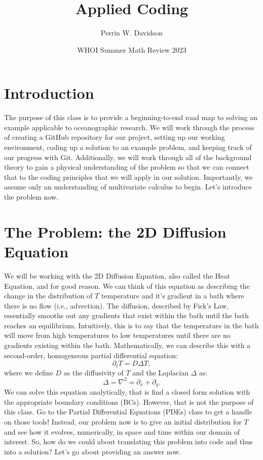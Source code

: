 \documentclass[11pt]{article}
\begin{document}
\title{Applied Coding}

\author{Perrin W. Davidson}

\date{WHOI Summer Math Review 2023}

\maketitle

\section*{Introduction}

The purpose of this class is to provide a beginning-to-end road map to solving an example applicable to oceanographic research.
We will work through the process of creating a GitHub repository for our project, setting up our working environment, coding up a solution to an example problem, and keeping track of our progress with Git. 
Additionally, we will work through all of the background theory to gain a physical understanding of the problem so that we can connect that to the coding principles that we will apply in our solution.
Importantly, we assume only an understanding of multivariate calculus to begin.
Let's introduce the problem now.

\section*{The Problem: the 2D Diffusion Equation}

We will be working with the 2D Diffusion Equation, also called the Heat Equation, and for good reason.
We can think of this equation as describing the change in the distribution of $T$ temperature and it's gradient in a bath where there is no flow (i.e., advection).
The diffusion, described by Fick's Law, essentially smooths out any gradients that exist within the bath until the bath reaches an equilibrium.
Intuitively, this is to say that the temperature in the bath will move from high temperatures to low temperatures until there are no gradients existing within the bath.
Mathematically, we can describe this with a second-order, homogeneous partial differential equation:
\begin{equation}
	\partial_t T = D\Delta T,
	\label{eq:diffusion}
\end{equation}
where we define $D$ as the diffusivity of  $T$ and the Laplacian $\Delta$ as:
\begin{equation}
	\Delta = \nabla ^2 = \partial_x + \partial_y.
\end{equation}
We can solve this equation analytically, that is find a closed form solution with the appropriate boundary conditions (BCs).
However, that is not the purpose of this class.
Go to the Partial Differential Equations (PDEs) class to get a handle on those tools!
Instead, our problem now is to give an initial distribution for $T$ and see how it evolves, numerically, in space and time within our domain of interest.
So, how do we could about translating this problem into code and thus into a solution? 
Let's go about providing an answer now. 
\end{document}
